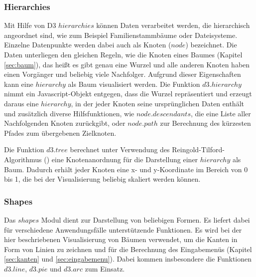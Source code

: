 \subsubsection*{Hierarchies}\label{sec:hierarchies}
Mit Hilfe von D3 $hierarchies$ können Daten verarbeitet werden, die hierarchisch angeordnet sind, wie zum Beispiel Familienstammbäume oder Dateisysteme. Einzelne Datenpunkte werden dabei auch als Knoten ($node$) bezeichnet. Die Daten unterliegen den gleichen Regeln, wie die Knoten eines Baumes (Kapitel \ref{sec:baum}), das heißt es gibt genau eine Wurzel und alle anderen Knoten haben einen Vorgänger und beliebig viele Nachfolger. Aufgrund dieser Eigenschaften kann eine $hierarchy$ als Baum visualisiert werden. Die Funktion $d3.hierarchy$ nimmt ein Javascript-Objekt entgegen, dass die Wurzel repräsentiert und erzeugt daraus eine $hierarchy$, in der jeder Knoten seine ursprünglichen Daten enthält und zusätzlich diverse Hilfsfunktionen, wie $node.descendants$, die eine Liste aller Nachfolgenden Knoten zurückgibt, oder $node.path$ zur Berechnung des kürzesten Pfades zum übergebenen Zielknoten.

Die Funktion $d3.tree$ berechnet unter Verwendung des Reingold-Tilford-Algorithmus (\citet{reingold1981tidier}) eine Knotenanordnung für die Darstellung einer $hierarchy$ als Baum. Dadurch erhält jeder Knoten eine x- und y-Koordinate im Bereich von 0 bis 1, die bei der Visualisierung beliebig skaliert werden können.

\subsubsection*{Shapes}
Das $shapes$ Modul dient zur Darstellung von beliebigen Formen. Es liefert dabei für verschiedene Anwendungsfälle unterstützende Funktionen. Es wird bei der hier beschriebenen Visualisierung von Bäumen verwendet, um die Kanten in Form von Linien zu zeichnen und für die Berechnung des Eingabemenüs (Kapitel \ref{sec:kanten} und \ref{sec:eingabemenu}). Dabei kommen insbesondere die Funktionen $d3.line$, $d3.pie$ und $d3.arc$ zum Einsatz.

